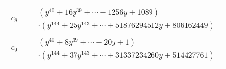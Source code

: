 \documentclass[1p]{elsarticle_modified}
\theoremstyle{definition}
\begin{document}
\begin{tabular}{m{50pt}|m{274pt}}
\hline $$\begin{aligned}c_{8}\end{aligned}$$&$\begin{aligned}
&(y^{40}+16 y^{39}+\cdots+1256 y+1089)\\
&\cdot(y^{144}+25 y^{143}+\cdots+51876294512 y+806162449)
\end{aligned}$\\
\hline $$\begin{aligned}c_{9}\end{aligned}$$&$\begin{aligned}
&(y^{40}+8 y^{39}+\cdots+20 y+1)\\
&\cdot(y^{144}+37 y^{143}+\cdots+31337234260 y+514427761)
\end{aligned}$\\
\hline
\end{tabular}
\vskip 2pc
\end{document}
